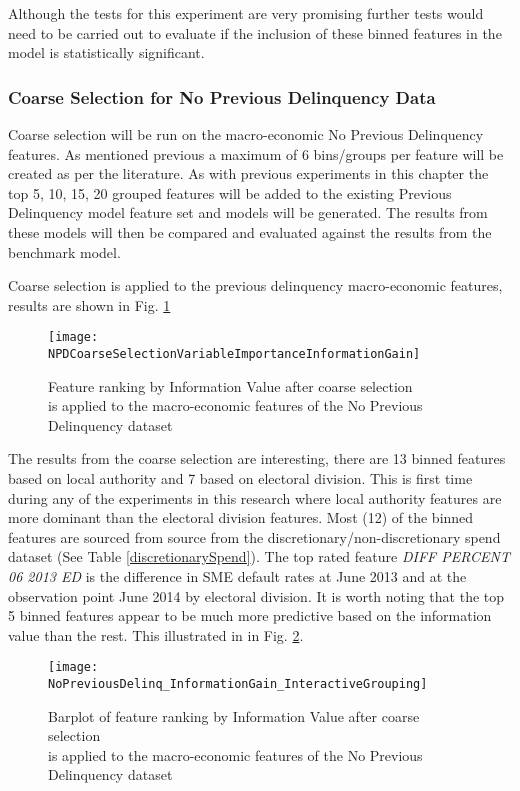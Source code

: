 Although the tests for this experiment are very promising further tests would need to be carried out to evaluate if the inclusion of these binned features in the model is statistically significant. 


\subsubsection{Coarse Selection for No Previous Delinquency Data}
Coarse selection will be run on the macro-economic No Previous Delinquency features. As mentioned previous a maximum of 6 bins/groups per feature will be created as per the literature. As with previous experiments in this chapter the top 5, 10, 15, 20 grouped features will be added to the existing Previous Delinquency model feature set and models will be generated. The results from these models will then be compared and evaluated against the results from the benchmark model.

Coarse selection is applied to the previous delinquency macro-economic features, results are shown in Fig. \ref{fig:NPDCoarseSelectionVariableImportanceInformationGain}

\begin{figure}[H]
	\texttt{[image: NPDCoarseSelectionVariableImportanceInformationGain]}
	\caption{Feature ranking by Information Value after coarse selection \\is applied to the macro-economic features of the No Previous Delinquency dataset}
	\label{fig:NPDCoarseSelectionVariableImportanceInformationGain}
\end{figure}


The results from the coarse selection are interesting, there are 13 binned features based on local authority and 7 based on electoral division. This is first time during any of the experiments in this research where local authority features are more dominant than the electoral division features. Most (12) of the binned features are sourced from source from the discretionary/non-discretionary spend dataset  (See Table \ref{discretionarySpend}). The top rated feature \textit{DIFF PERCENT 06 2013 ED} is the difference in SME default rates at June 2013 and at the observation point June 2014 by electoral division. It is worth noting that the top 5 binned features appear to be much more predictive based on the information value than the rest. This illustrated in in Fig. \ref{fig:Information Value using SAS No Previous Delinquency Features}.

\begin{figure}[H]
	\texttt{[image: NoPreviousDelinq\_InformationGain\_InteractiveGrouping]}
	\caption{Barplot of feature ranking by Information Value after coarse selection \\is applied to the macro-economic features of the No Previous Delinquency dataset}
	\label{fig:Information Value using SAS No Previous Delinquency Features}
\end{figure}

